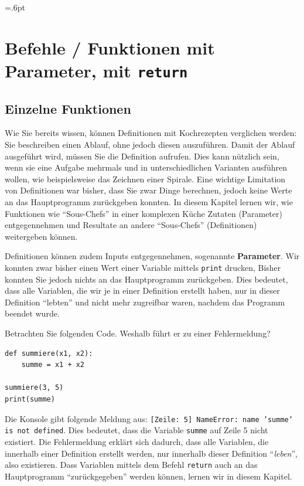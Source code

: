 \fboxsep=.6pt

\section{Befehle / Funktionen mit Parameter, mit \texorpdfstring{\lstinline|return|}{return}}
\subsection{Einzelne Funktionen}

Wie Sie bereits wissen, können Definitionen mit Kochrezepten verglichen werden: Sie beschreiben einen Ablauf, ohne jedoch diesen auszuführen. Damit der Ablauf ausgeführt wird, müssen Sie die Definition aufrufen. Dies kann nützlich sein, wenn sie eine Aufgabe mehrmals und in unterschiedlichen Varianten ausführen wollen, wie beispielsweise das Zeichnen einer Spirale. Eine wichtige Limitation von Definitionen war bisher, dass Sie zwar Dinge berechnen, jedoch keine Werte an das Hauptprogramm zurückgeben konnten. In diesem Kapitel lernen wir, wie Funktionen wie ``Sous-Chefs'' in einer komplexen Küche Zutaten (Parameter) entgegennehmen und Resultate an andere ``Sous-Chefs''  (Definitionen) weitergeben können.


Definitionen können zudem Inputs entgegennehmen, sogenannte \textbf{Parameter}. Wir konnten zwar bisher einen Wert einer Variable mittels \lstinline|print| drucken, Bisher konnten Sie jedoch nichts an das Hauptprogramm zurückgeben. Dies bedeutet, dass alle Variablen, die wir je in einer Definition erstellt haben, nur in dieser Definition ``lebten'' und nicht mehr zugreifbar waren, nachdem das Programm beendet wurde.

\begin{myexample}\label{ex:sum-noreturn}
Betrachten Sie folgenden Code. Weshalb führt er zu einer Fehlermeldung?
\begin{lstlisting}
def summiere(x1, x2):
    summe = x1 + x2
    
summiere(3, 5)
print(summe)
\end{lstlisting}
Die Konsole gibt folgende Meldung aus: \texttt{[Zeile: 5] NameError: name 'summe' is not defined}. Dies bedeutet, dass die Variable \lstinline|summe| auf Zeile 5 nicht existiert. Die Fehlermeldung erklärt sich dadurch, dass alle Variablen, die innerhalb einer Definition erstellt werden, nur innerhalb dieser Definition ``\textit{leben}'', also existieren. Dass Variablen mittels dem Befehl \lstinline|return| auch an das Hauptprogramm ``zurückgegeben'' werden können, lernen wir in diesem Kapitel.
\end{myexample}

